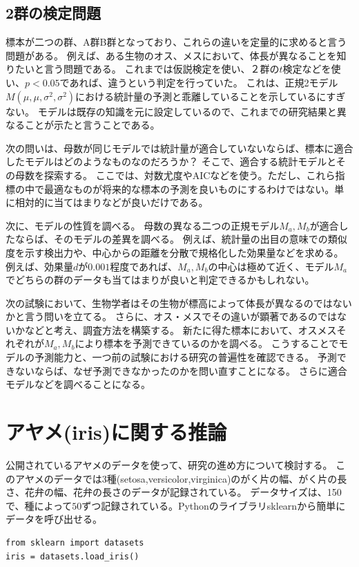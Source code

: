 \subsection{2群の検定問題}
標本が二つの群、A群B群となっており、これらの違いを定量的に求めると言う問題がある。
例えば、ある生物のオス、メスにおいて、体長が異なることを知りたいと言う問題である。
これまでは仮説検定を使い、２群の$t$検定などを使い、$p<0.05$であれば、違うという判定を行っていた。
これは、正規2モデル$M(\mu,\mu,\sigma^2,\sigma^2)$における統計量の予測と乖離していることを示しているにすぎない。
モデルは既存の知識を元に設定しているので、これまでの研究結果と異なることが示たと言うことである。

次の問いは、母数が同じモデルでは統計量が適合していないならば、標本に適合したモデルはどのようなものなのだろうか？
そこで、適合する統計モデルとその母数を探索する。
ここでは、対数尤度やAICなどを使う。ただし、これら指標の中で最適なものが将来的な標本の予測を良いものにするわけではない。単に相対的に当てはまりなどが良いだけである。

次に、モデルの性質を調べる。
母数の異なる二つの正規モデル$M_a,M_b$が適合したならば、そのモデルの差異を調べる。
例えば、統計量の出目の意味での類似度を示す検出力や、中心からの距離を分散で規格化した効果量などを求める。
例えば、効果量$d$が$0.001$程度であれば、$M_a,M_b$の中心は極めて近く、モデル$M_a$でどちらの群のデータも当てはまりが良いと判定できるかもしれない。

次の試験において、生物学者はその生物が標高によって体長が異なるのではないかと言う問いを立てる。
さらに、オス・メスでその違いが顕著であるのではないかなどと考え、調査方法を構築する。
新たに得た標本において、オスメスそれぞれが$M_a,M_b$により標本を予測できているのかを調べる。
こうすることでモデルの予測能力と、一つ前の試験における研究の普遍性を確認できる。
予測できないならば、なぜ予測できなかったのかを問い直すことになる。
さらに適合モデルなどを調べることになる。


\section{アヤメ(iris)に関する推論}
公開されているアヤメのデータを使って、研究の進め方について検討する。
このアヤメのデータでは$3$種(setosa,versicolor,virginica)のがく片の幅、がく片の長さ、花弁の幅、花弁の長さのデータが記録されている。
データサイズは、150で、種によって$50$ずつ記録されている。Pythonのライブラリsklearnから簡単にデータを呼び出せる。
\begin{lstlisting}
from sklearn import datasets
iris = datasets.load_iris()
\end{lstlisting}

